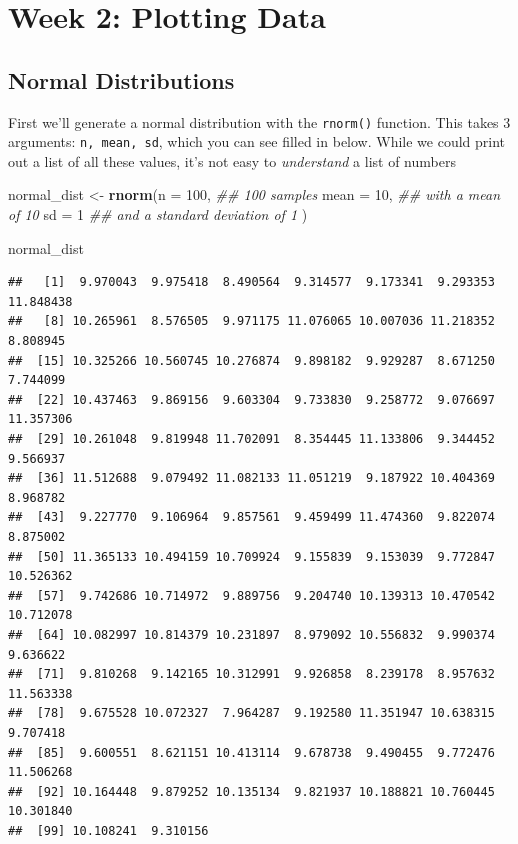\documentclass[
]{book}
\newenvironment{Shaded}{\begin{snugshade}}{\end{snugshade}}
\newcommand{\CommentTok}[1]{\textcolor[rgb]{0.56,0.35,0.01}{\textit{#1}}}
\newcommand{\DataTypeTok}[1]{\textcolor[rgb]{0.13,0.29,0.53}{#1}}
\newcommand{\DecValTok}[1]{\textcolor[rgb]{0.00,0.00,0.81}{#1}}
\newcommand{\KeywordTok}[1]{\textcolor[rgb]{0.13,0.29,0.53}{\textbf{#1}}}
\newcommand{\NormalTok}[1]{#1}
\newcommand{\StringTok}[1]{\textcolor[rgb]{0.31,0.60,0.02}{#1}}
\begin{document}
\hypertarget{week-2-plotting-data}{%
\section{Week 2: Plotting Data}\label{week-2-plotting-data}}

\hypertarget{normal-distributions}{%
\subsection{Normal Distributions}\label{normal-distributions}}

First we'll generate a normal distribution with the \texttt{rnorm()} function. This takes 3 arguments: \texttt{n,\ mean,\ sd}, which you can see filled in below. While we could print out a list of all these values, it's not easy to \emph{understand} a list of numbers

\begin{Shaded}
\begin{Highlighting}[]
\NormalTok{normal_dist <-}\StringTok{ }\KeywordTok{rnorm}\NormalTok{(}\DataTypeTok{n =} \DecValTok{100}\NormalTok{, }\CommentTok{## 100 samples}
                     \DataTypeTok{mean =} \DecValTok{10}\NormalTok{, }\CommentTok{## with a mean of 10}
                     \DataTypeTok{sd =} \DecValTok{1} \CommentTok{## and a standard deviation of 1}
\NormalTok{                     )}


\NormalTok{normal_dist}
\end{Highlighting}
\end{Shaded}

\begin{verbatim}
##   [1]  9.970043  9.975418  8.490564  9.314577  9.173341  9.293353 11.848438
##   [8] 10.265961  8.576505  9.971175 11.076065 10.007036 11.218352  8.808945
##  [15] 10.325266 10.560745 10.276874  9.898182  9.929287  8.671250  7.744099
##  [22] 10.437463  9.869156  9.603304  9.733830  9.258772  9.076697 11.357306
##  [29] 10.261048  9.819948 11.702091  8.354445 11.133806  9.344452  9.566937
##  [36] 11.512688  9.079492 11.082133 11.051219  9.187922 10.404369  8.968782
##  [43]  9.227770  9.106964  9.857561  9.459499 11.474360  9.822074  8.875002
##  [50] 11.365133 10.494159 10.709924  9.155839  9.153039  9.772847 10.526362
##  [57]  9.742686 10.714972  9.889756  9.204740 10.139313 10.470542 10.712078
##  [64] 10.082997 10.814379 10.231897  8.979092 10.556832  9.990374  9.636622
##  [71]  9.810268  9.142165 10.312991  9.926858  8.239178  8.957632 11.563338
##  [78]  9.675528 10.072327  7.964287  9.192580 11.351947 10.638315  9.707418
##  [85]  9.600551  8.621151 10.413114  9.678738  9.490455  9.772476 11.506268
##  [92] 10.164448  9.879252 10.135134  9.821937 10.188821 10.760445 10.301840
##  [99] 10.108241  9.310156
\end{verbatim}
\end{document}
